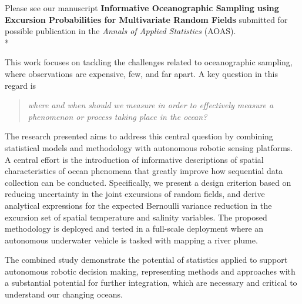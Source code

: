 \documentclass[10pt,stdletter]{newlfm}
\begin{document}
\begin{newlfm}

Please see our manuscript \textbf{Informative Oceanographic Sampling using Excursion Probabilities for Multivariate Random Fields} submitted for possible publication in the \emph{Annals of Applied Statistics} (AOAS).\\*

This work focuses on tackling the challenges related to oceanographic sampling, where observations are expensive, few, and far apart. A key question in this regard is 

\begin{quote}
\textit{where and when should we measure in order to effectively measure a phenomenon or process taking place in the ocean?}      
\end{quote}{}

The research presented aims to address this central question by combining statistical models and methodology with autonomous robotic sensing platforms. A central effort is the introduction of informative descriptions of spatial characteristics of ocean phenomena that greatly improve how sequential data collection can be conducted. Specifically, we present a design criterion based on reducing uncertainty in the joint excursions of random fields, and derive analytical expressions for the expected Bernoulli variance reduction in the excursion set of spatial temperature and salinity variables. The proposed methodology is deployed and tested in a full-scale deployment where an autonomous underwater vehicle is tasked with mapping a river plume. 

The combined study demonstrate the potential of statistics applied to support autonomous robotic decision making, representing methods and approaches with a substantial potential for further integration, which are necessary and critical to understand our changing oceans. 
\vspace{1em}


\end{newlfm}
\end{document}
